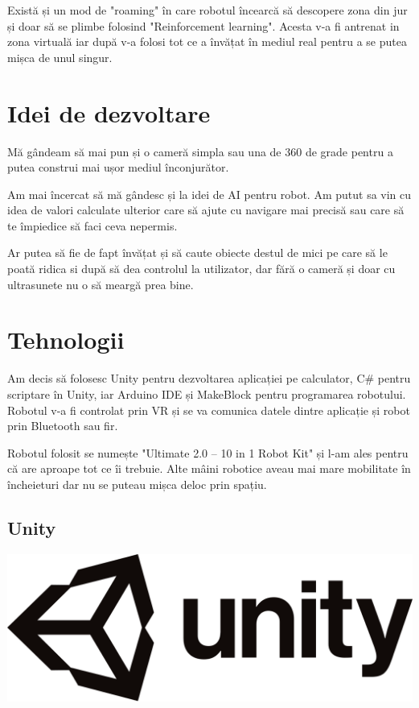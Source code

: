 \documentclass[12pt,a4paper]{article}
\begin{document}
	\par Există și un mod de "roaming" în care robotul încearcă să descopere zona din jur și doar să se plimbe folosind "Reinforcement learning". Acesta v-a fi antrenat in zona virtuală iar după v-a folosi tot ce a învățat în mediul real pentru a se putea mișca de unul singur.
	
	\section{Idei de dezvoltare}
	
	\par Mă gândeam să mai pun și o cameră simpla sau una de 360 de grade pentru a putea construi mai ușor mediul înconjurător. 
	
	\par Am mai încercat să mă gândesc și la idei de AI pentru robot. Am putut sa vin cu idea de valori calculate ulterior care să ajute cu navigare mai precisă sau care să te împiedice să faci ceva nepermis. 
	
	\par Ar putea să fie de fapt învățat și să caute obiecte destul de mici pe care să le poată ridica si după să dea controlul la utilizator, dar fără o cameră și doar cu ultrasunete nu o să meargă prea bine. 
	
	
	\section{Tehnologii}

	\par Am decis să folosesc Unity pentru dezvoltarea aplicației pe calculator, C\# pentru scriptare în Unity, iar Arduino IDE și MakeBlock pentru programarea robotului. Robotul v-a fi controlat prin VR și se va comunica datele dintre aplicație și robot prin Bluetooth sau fir.
	
	\par Robotul folosit se numește "Ultimate 2.0 – 10 in 1 Robot Kit" și l-am ales pentru că are aproape tot ce îi trebuie. Alte mâini robotice aveau mai mare mobilitate în încheieturi dar nu se puteau mișca deloc prin spațiu.
	
	\subsection{Unity}
	
	\begin{center}
		\includegraphics[scale=0.2]{unity.png}
	\end{center}
\end{document}
